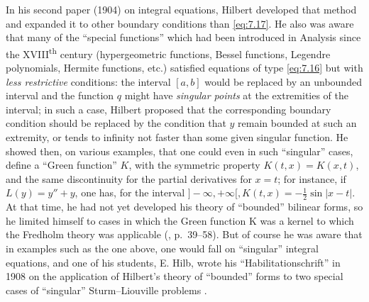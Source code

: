 \documentclass[12pt,a4paper,leqno,twoside]{extbook}
\newcommand{\supth}{\texorpdfstring{\textsuperscript{th}}{th}}
\begin{document}
In his second paper (1904) on integral equations, Hilbert developed that method and expanded it to other boundary conditions than \eqref{eq:7.17}. He also was aware that many of the ``special functions'' which had been introduced in Analysis since the XVIII\supth{} century (hypergeometric functions, Bessel functions, Legendre polynomials, Hermite functions, etc.) satisfied equations of type \eqref{eq:7.16} but with \emph{less restrictive} conditions: the interval \([a,b]\) would be replaced by an unbounded interval and the function \(q\) might have \emph{singular points} at the extremities of the interval; in such a case, Hilbert proposed that the corresponding boundary condition should be replaced by the condition that \(y\) remain bounded at such an extremity, or tends to infinity not faster than some given singular function. He showed then, on various examples, that one could even in such ``singular'' cases, define a ``Green function'' \(K\), with the symmetric property \(K(t,x) = K(x,t)\), and the same discontinuity for the partial derivatives for \(x = t\); for instance, if \(L(y) = y'' + y\), one has, for the interval \(]-\infty, +\infty[, K(t,x) = -\frac{1}{2} \sin{|x-t|}\). At that time, he had not yet developed his theory of ``bounded'' bilinear forms, so he limited himself to cases in which the Green function K was a kernel to which the Fredholm theory was applicable (\cite{112}, p.~39--58). But of course he was aware that in examples such as the one above, one would fall on ``singular'' integral equations, and one of his students, E. Hilb, wrote his ``Habilitationschrift'' in 1908 on the application of Hilbert's theory of ``bounded'' forms to two special cases of ``singular'' Sturm--Liouville problems \cite{110}.
\end{document}
